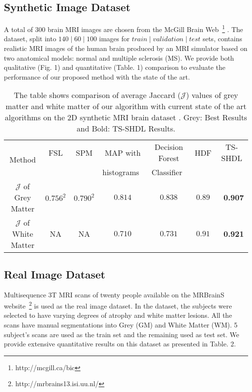 \documentclass[10pt,twocolumn,letterpaper]{article}
\begin{document}
\subsection{Synthetic Image Dataset}
A total of 300 brain MRI images are chosen from the McGill Brain Web~\footnote{http://mcgill.ca/bic} \cite{kwan1999mri}. The dataset, split into $140\mid 60\mid 100$ images for $train\mid validation\mid test$ sets, contains realistic MRI images of the human brain produced by an MRI simulator based on two anatomical models: normal and multiple sclerosis (MS). We provide both qualitative (Fig. 1) and quantitative (Table. 1) comparison to evaluate the performance of our proposed method with the state of the art. 

\begin{table*}[!t]
	\centering
	\caption{The table shows comparison of average Jaccard ($\mathcal{J}$) values of grey matter and white matter of our algorithm with current state of the art algorithms on the 2D synthetic MRI brain dataset \cite{kwan1999mri}. Grey: Best Results and Bold: TS-SHDL Results.}
	
	\begin{tabular}{|c||c|c|c|c|c|c|} 
		\hline
		\multirow{2}{*}{Method} &  FSL & SPM & MAP with & Decision Forest  & HDF& TS-SHDL\\
		&~\cite{zhang2001segmentation}&~\cite{ashburner1997multimodal}&histograms~\cite{yi2009discriminative}&Classifier~\cite{zhang2001segmentation}&~\cite{madiraju2016level}& \\
		\hline\hline
		$\mathcal{J}$ of Grey Matter&$0.756^2$&$0.790^2$&$0.814$&$0.838$& $0.89$&~\cellcolor{gray!50}\textbf{0.907}\\
		$\mathcal{J}$ of White Matter&NA&NA&$0.710$&$0.731$& $0.91$&~\cellcolor{gray!50}\textbf{0.921}\\
		\hline
	\end{tabular}
	
	\label{table:1}
\end{table*}


\subsection{Real Image Dataset}
Multisequence 3T MRI scans of twenty people available on the MRBrainS website~\footnote{http://mrbrains13.isi.uu.nl/} \cite{mendrik2015mrbrains} is used as the real image dataset. In the dataset, the subjects were selected to have varying degrees of atrophy and white matter lesions. All the scans have manual segmentations into Grey (GM) and White Matter (WM). 5 subject's scans are used as the train set and the remaining used as test set. We provide extensive quantitative results on this dataset as presented in Table. 2.
\end{document}
